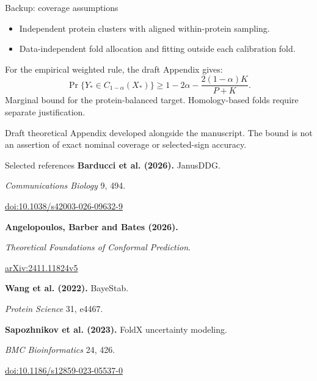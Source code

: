 \documentclass[aspectratio=169,14pt]{beamer}
\newcommand{\sources}[1]{\vfill{\scriptsize\color{Muted}#1\par}}
\begin{document}
\begin{frame}{Backup: coverage assumptions}
  \begin{itemize}
    \item Independent protein clusters with aligned within-protein sampling.
    \item Data-independent fold allocation and fitting outside each calibration fold.
  \end{itemize}
  \medskip
  For the empirical weighted rule, the draft Appendix gives:
  \[
    \Pr\{Y_*\in C_{1-\alpha}(X_*)\}
    \geq 1-2\alpha-\frac{2(1-\alpha)K}{P+K}.
  \]
  \medskip
  Marginal bound for the protein-balanced target. Homology-based folds require separate justification.
  \sources{Draft theoretical Appendix developed alongside the manuscript. The bound is not an assertion of exact nominal coverage or selected-sign accuracy.}
\end{frame}

\begin{frame}{Selected references}
  \small
  \textbf{Barducci et al. (2026).} JanusDDG.\par
  \textit{Communications Biology} 9, 494.\par
  \href{https://doi.org/10.1038/s42003-026-09632-9}{doi:10.1038/s42003-026-09632-9}
  \par\medskip
  \textbf{Angelopoulos, Barber and Bates (2026).}\par
  \textit{Theoretical Foundations of Conformal Prediction}.\par
  \href{https://arxiv.org/abs/2411.11824}{arXiv:2411.11824v5}
  \par\medskip
  \textbf{Wang et al. (2022).} BayeStab.\par
  \textit{Protein Science} 31, e4467.
  \par\medskip
  \textbf{Sapozhnikov et al. (2023).} FoldX uncertainty modeling.\par
  \textit{BMC Bioinformatics} 24, 426.\par
  \href{https://doi.org/10.1186/s12859-023-05537-0}{doi:10.1186/s12859-023-05537-0}
\end{frame}
\end{document}
